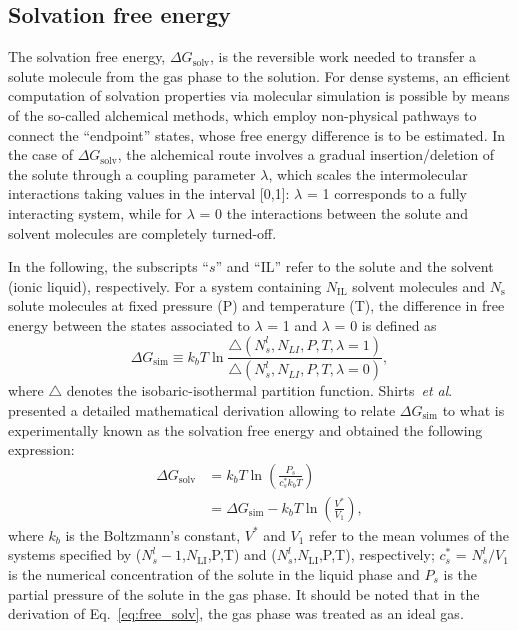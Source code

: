 \documentclass[3p,twocolumn]{elsarticle}
\begin{document}
\subsection*{Solvation free energy}
The solvation free energy, $\Delta G_{\text{solv}}$, is the reversible work needed to transfer a solute molecule from the gas phase to the solution. For dense systems, an efficient computation of solvation properties via molecular simulation is possible by means of the so-called alchemical methods, which employ non-physical pathways to connect the ``endpoint'' states, whose free energy difference is to be estimated. In the case of $\Delta G_{\text{solv}}$, the alchemical route involves a gradual insertion/deletion of the solute through a coupling parameter $\lambda$, which scales the intermolecular interactions taking values in the interval [0,1]: $\lambda$ = 1 corresponds to a fully interacting system, while for $\lambda$ = 0 the interactions between the solute and solvent molecules are completely turned-off.

In the following, the subscripts ``$s$'' and ``$\text{IL}$'' refer to the solute and the solvent (ionic liquid), respectively. For a system containing $N_{\text{IL}}$ solvent molecules and $N_{\text{s}}$ solute molecules at fixed pressure (P) and temperature (T), the difference in free energy between the states associated to $\lambda$ = 1 and $\lambda$ = 0 is defined as
\begin{equation}
\Delta G_{\text{sim}} \equiv k_b T \ln \frac{\bigtriangleup (N_s^l,N_{LI},P,T,\lambda = 1)}{\bigtriangleup (N_s^l,N_{LI},P,T,\lambda = 0)}, 
\end{equation}
where $\bigtriangleup$ denotes the isobaric-isothermal partition function. Shirts~\textit{et al}.~\cite{Shirts_2003} presented a detailed mathematical derivation allowing to relate $\Delta G_{\text{sim}}$ to what is experimentally known as the solvation free energy and obtained the following expression: 
\begin{equation}
\begin{split}
\label{eq:free_solv}
 \Delta G_{\text{solv}}& =  k_b T \ln \left( \frac{P_s}{c_s^{\ast} k_b T} \right)\\ &= \Delta G_{\text{sim}} - k_bT \ln \left( \frac{V^{\ast}}{V_1} \right) ,
\end{split}
\end{equation}
where $k_b$ is the Boltzmann's constant, $V^{\ast}$ and $V_1$ refer to the mean volumes of the systems specified by ($N_s^l-1$,$N_{\text{LI}}$,P,T) and ($N_s^l$,$N_{\text{LI}}$,P,T), respectively; $c_s^{\ast}$ = $N_s^l/V_1$ is the numerical concentration of the solute in the liquid phase and $P_s$ is the partial pressure of the solute in the gas phase. It should be noted that in the derivation of Eq.~\ref{eq:free_solv}, the gas phase was treated as an ideal gas. 
\end{document}
